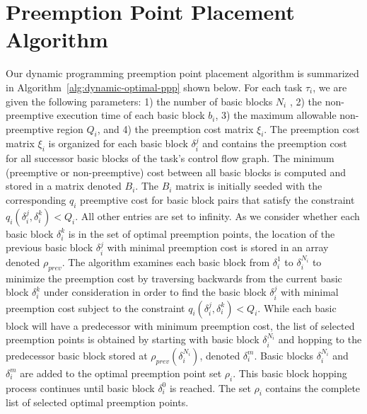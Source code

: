\vspace{-10pt}
\section{Preemption Point Placement Algorithm}\label{sec:implementation}

Our dynamic programming preemption point placement algorithm is summarized in Algorithm~\ref{alg:dynamic-optimal-ppp} shown below.  For each task $\tau_i$, we are given the following parameters: 1) the number of basic blocks $N_i$ , 2) the non-preemptive execution time of each basic block $b_i$, 3) the maximum allowable non-preemptive region $Q_i$, and 4) the preemption cost matrix $\xi_i$.  The preemption cost matrix $\xi_i$ is organized for each basic block \begin{math}\delta_{i}^{j}\end{math} and contains the preemption cost for all successor basic blocks of the task's control flow graph.  The minimum (preemptive or non-preemptive) cost between all basic blocks is computed and stored in a matrix denoted $B_{i}$.  The $B_{i}$ matrix is initially seeded with the corresponding $q_i$ preemptive cost for basic block pairs that satisfy the constraint $q_{i}(\delta_{i}^{j},\delta_{i}^{k}) < Q_{i}$. All other entries are set to infinity.  As we consider whether each basic block $\delta_{i}^{k}$ is in the set of optimal preemption points, the location of the previous basic block $\delta_{i}^{j}$ with minimal preemption cost is stored in an array denoted $\rho_{prev}$.  The algorithm examines each basic block from \begin{math}\delta_{i}^{1}\end{math} to \begin{math}\delta_{i}^{N_i}\end{math} to minimize the preemption cost by traversing backwards from the current basic block $\delta_{i}^{k}$ under consideration in order to find the basic block $\delta_{i}^{j}$ with minimal preemption cost subject to the constraint $q_{i}(\delta_{i}^{j},\delta_{i}^{k}) < Q_{i}$.  While each basic block will have a predecessor with minimum preemption cost, the list of selected preemption points is obtained by starting with basic block $\delta_{i}^{N_i}$ and hopping to the predecessor basic block stored at $\rho_{prev}(\delta_{i}^{N_i})$, denoted $\delta_{i}^{m}$.  Basic blocks $\delta_{i}^{N_i}$ and $\delta_{i}^{m}$ are added to the optimal preemption point set $\rho_{i}$.  This basic block hopping process continues until basic block $\delta_{i}^{0}$ is reached.  The set $\rho_{i}$ contains the complete list of selected optimal preemption points.
